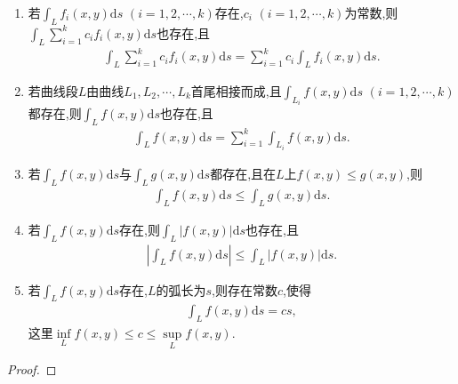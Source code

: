 \documentclass[../../main.tex]{subfiles}%
\begin{document}
\begin{theorem}
\begin{enumerate}[(1)]
\item 若$\int_L f_i(x,y)\mathrm{d}s$ $(i=1,2,\cdots,k)$存在,$c_i$ $(i=1,2,\cdots,k)$为常数,则$\int_L \sum\limits_{i=1}^k c_i f_i(x,y)\mathrm{d}s$也存在,且
\begin{align*}
\int_L \sum\limits_{i=1}^k c_i f_i(x,y)\mathrm{d}s = \sum\limits_{i=1}^k c_i \int_L f_i(x,y)\mathrm{d}s.
\end{align*}

\item 若曲线段$L$由曲线$L_1,L_2,\cdots,L_k$首尾相接而成,且$\int_{L_i} f(x,y)\mathrm{d}s$ $(i=1,2,\cdots,k)$都存在,则$\int_L f(x,y)\mathrm{d}s$也存在,且
\begin{align*}
\int_L f(x,y)\mathrm{d}s = \sum\limits_{i=1}^k \int_{L_i} f(x,y)\mathrm{d}s.
\end{align*}

\item 若$\int_L f(x,y)\mathrm{d}s$与$\int_L g(x,y)\mathrm{d}s$都存在,且在$L$上$f(x,y) \leqslant g(x,y)$,则
\begin{align*}
\int_L f(x,y)\mathrm{d}s \leqslant \int_L g(x,y)\mathrm{d}s.
\end{align*}

\item 若$\int_L f(x,y)\mathrm{d}s$存在,则$\int_L |f(x,y)|\mathrm{d}s$也存在,且
\begin{align*}
\left| \int_L f(x,y)\mathrm{d}s \right| \leqslant \int_L |f(x,y)|\mathrm{d}s.
\end{align*}

\item 若$\int_L f(x,y)\mathrm{d}s$存在,$L$的弧长为$s$,则存在常数$c$,使得
\begin{align*}
\int_L f(x,y)\mathrm{d}s = cs,
\end{align*}
这里$\inf\limits_L f(x,y) \leqslant c \leqslant \sup\limits_L f(x,y)$.
\end{enumerate}
\end{theorem}
\begin{proof}

\end{proof}
\end{document}
